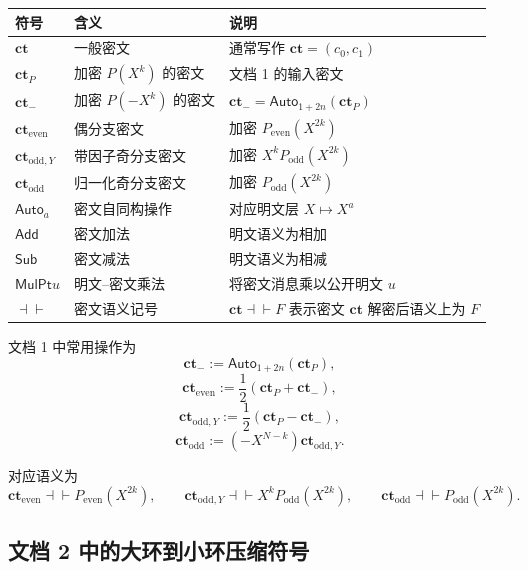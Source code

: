 \documentclass[11pt]{article}
\newcommand{\Pe}{P_{\mathrm{even}}}
\newcommand{\Po}{P_{\mathrm{odd}}}
\newcommand{\ct}{\mathbf{ct}}
\newcommand{\ctP}{\mathbf{ct}_P}
\newcommand{\cte}{\mathbf{ct}_{\mathrm{even}}}
\newcommand{\cto}{\mathbf{ct}_{\mathrm{odd}}}
\newcommand{\ctoy}{\mathbf{ct}_{\mathrm{odd},Y}}
\newcommand{\Auto}{\mathsf{Auto}}
\newcommand{\MulPt}{\mathsf{MulPt}}
\newcommand{\Add}{\mathsf{Add}}
\newcommand{\Sub}{\mathsf{Sub}}
\newcommand{\rep}{\mathrel{\dashv\vdash}}
\begin{document}
\begin{center}
\begin{tabular}{lll}
\toprule
符号 & 含义 & 说明 \\
\midrule
\(\ct\) & 一般密文 & 通常写作 \(\ct=(c_0,c_1)\) \\
\(\ctP\) & 加密 \(P(X^k)\) 的密文 & 文档 1 的输入密文 \\
\(\ct_-\) & 加密 \(P(-X^k)\) 的密文 & \(\ct_-=\Auto_{1+2n}(\ctP)\) \\
\(\cte\) & 偶分支密文 & 加密 \(\Pe(X^{2k})\) \\
\(\ctoy\) & 带因子奇分支密文 & 加密 \(X^k\Po(X^{2k})\) \\
\(\cto\) & 归一化奇分支密文 & 加密 \(\Po(X^{2k})\) \\
\(\Auto_a\) & 密文自同构操作 & 对应明文层 \(X\mapsto X^a\) \\
\(\Add\) & 密文加法 & 明文语义为相加 \\
\(\Sub\) & 密文减法 & 明文语义为相减 \\
\(\MulPt{u}\) & 明文--密文乘法 & 将密文消息乘以公开明文 \(u\) \\
\(\rep\) & 密文语义记号 & \(\ct\rep F\) 表示密文 \(\ct\) 解密后语义上为 \(F\) \\
\bottomrule
\end{tabular}
\end{center}

文档 1 中常用操作为
\[
\ct_-:=\Auto_{1+2n}(\ctP),
\]
\[
\cte:=\frac{1}{2}(\ctP+\ct_-),
\]
\[
\ctoy:=\frac{1}{2}(\ctP-\ct_-),
\]
\[
\cto:=(-X^{N-k})\ctoy.
\]

对应语义为
\[
\cte\rep \Pe(X^{2k}),
\qquad
\ctoy\rep X^k\Po(X^{2k}),
\qquad
\cto\rep \Po(X^{2k}).
\]

\subsection{文档 2 中的大环到小环压缩符号}
\end{document}
